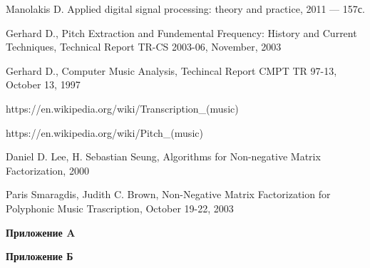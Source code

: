 \documentclass[oneside, final, 14pt]{extarticle}
\begin{document}
\cleardoublepage
{}
\begin{thebibliography}{0}

	 Manolakis D. Applied digital signal
		processing: theory and practice, 2011 --- 157с.


	 Gerhard D., Pitch Extraction and Fundemental Frequency:
		History and Current Techniques, Technical Report TR-CS 2003-06, November, 2003

	 Gerhard D., Computer Music Analysis, Techincal Report CMPT
		TR 97-13, October 13, 1997

	 https://en.wikipedia.org/wiki/Transcription\_(music)

	 https://en.wikipedia.org/wiki/Pitch\_(music)

     Daniel D. Lee, H. Sebastian Seung,
        Algorithms for Non-negative Matrix Factorization, 2000

     Paris Smaragdis, Judith C. Brown,
        Non-Negative Matrix Factorization
        for Polyphonic Music Trascription, October 19-22, 2003

\end{thebibliography}

\cleardoublepage
\appendix
{\large \bf Приложение A} \\

{\large \bf Приложение Б} \\
\end{document}
